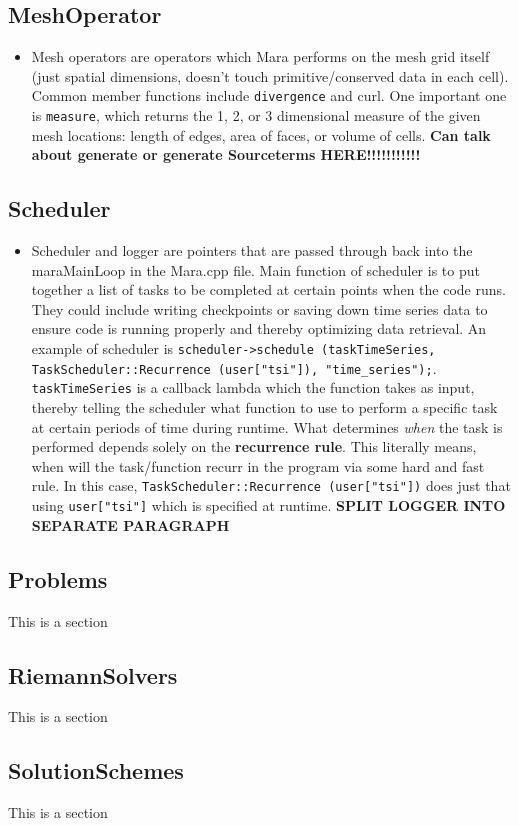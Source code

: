 \documentclass{article}
\begin{document}
\subsection{MeshOperator}
\begin{itemize}
	\item Mesh operators are operators which Mara performs on the mesh grid itself (just spatial dimensions, doesn't touch primitive/conserved data in each cell). Common member functions include \texttt{divergence} and {curl}. One important one is \texttt{measure}, which returns the 1, 2, or 3 dimensional measure of the given mesh locations: length of edges, area of faces, or volume of cells. \textbf{ Can talk about generate or generate Sourceterms HERE!!!!!!!!!!!}
\end{itemize}

\subsection{Scheduler}
\begin{itemize}
	\item Scheduler and logger are pointers that are passed through back into the maraMainLoop in the Mara.cpp file. Main function of scheduler is to put together a list of tasks to be completed at certain points when the code runs. They could include writing checkpoints or saving down time series data to ensure code is running properly and thereby optimizing data retrieval. An example of scheduler is \texttt{scheduler->schedule (taskTimeSeries, TaskScheduler::Recurrence (user["tsi"]), "time\_series");}. \texttt{taskTimeSeries} is a callback lambda which the function takes as input, thereby telling the scheduler what function to use to perform a specific task at certain periods of time during runtime. What determines \emph{when} the task is performed depends solely on the \textbf{recurrence rule}. This literally means, when will the task/function recurr in the program via some hard and fast rule. In this case, \texttt{TaskScheduler::Recurrence (user["tsi"])} does just that using \texttt{user["tsi"]} which is specified at runtime. \textbf{SPLIT LOGGER INTO SEPARATE PARAGRAPH}
\end{itemize}


\subsection{Problems}
This is a section 

\subsection{RiemannSolvers}
This is a section 

\subsection{SolutionSchemes}
This is a section 
\end{document}
